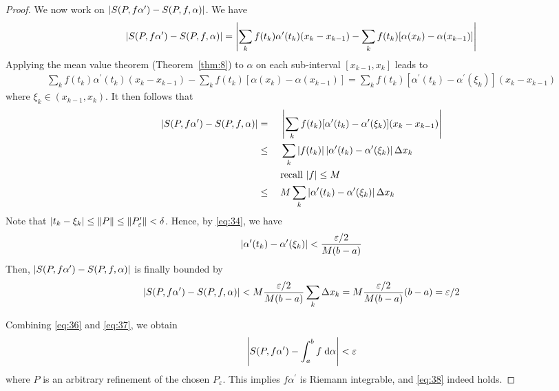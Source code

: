 \documentclass[thmcnt=section, 12pt]{my-elegantbook}
\begin{document}
\begin{proof}
    \par We now work on $\left\lvert S(P, f\alpha^\prime) - S(P, f, \alpha) \right\rvert$. We have 
    \begin{align*}
        \left\lvert S(P, f\alpha^\prime) - S(P, f, \alpha) \right\rvert
        = \left\lvert 
            \sum_{k} f(t_k) \alpha^\prime(t_k) (x_k - x_{k-1})
            - \sum_{k} f(t_k) [\alpha(x_{k}) - \alpha(x_{k-1})]
         \right\rvert
    \end{align*}
    Applying the mean value theorem (Theorem~\ref{thm:8}) to $\alpha$ on each sub-interval $[x_{k-1}, x_k]$ leads to 
    \begin{align*}
        \sum_{k} f(t_k) \alpha^\prime(t_k) (x_k - x_{k-1})
            - \sum_{k} f(t_k) [\alpha(x_{k}) - \alpha(x_{k-1})]
        = \sum_{k} f(t_k) [\alpha^\prime(t_k) - \alpha^\prime(\xi_k)] (x_k - x_{k-1})
    \end{align*}
    where $\xi_k \in (x_{k-1}, x_k)$. It then follows that 
    \begin{alignat*}{2}
        \left\lvert S(P, f\alpha^\prime) - S(P, f, \alpha) \right\rvert
        &=& \; & \left\lvert \sum_{k} f(t_k) [\alpha^\prime(t_k) - \alpha^\prime(\xi_k)] (x_k - x_{k-1}) \right\rvert \\ 
        &\leq&& \sum_{k} \left\lvert f(t_k) \right\rvert \left\lvert \alpha^\prime(t_k) - \alpha^\prime(\xi_k) \right\rvert \Delta x_k \\ 
        &&&\text{recall $\left\lvert f \right\rvert \leq M$} \\
        &\leq&& M \sum_{k} \left\lvert \alpha^\prime(t_k) - \alpha^\prime(\xi_k) \right\rvert \Delta x_k
    \end{alignat*}
    Note that $\left\lvert t_k - \xi_k \right\rvert \leq \left\lVert P \right\rVert \leq \left\lVert P_\varepsilon^\prime \right\rVert < \delta$. Hence, by \eqref{eq:34}, we have 
    \begin{align*}
        \left\lvert \alpha^\prime(t_k) - \alpha^\prime(\xi_k) \right\rvert
        < \frac{\varepsilon / 2}{M(b-a)}
    \end{align*}
    Then, $\left\lvert S(P, f\alpha^\prime) - S(P, f, \alpha) \right\rvert$ is finally bounded by
    \begin{align}
        \left\lvert S(P, f\alpha^\prime) - S(P, f, \alpha) \right\rvert
        < M \frac{\varepsilon / 2}{M(b-a)} \sum_k \Delta x_k
        =  M \frac{\varepsilon / 2}{M(b-a)} (b-a)
        = \varepsilon / 2
        \label{eq:37}
    \end{align}

    \par Combining \eqref{eq:36} and \eqref{eq:37}, we obtain
    \begin{align*}
        \left\lvert S(P, f\alpha^\prime) - \int_{a}^{b}f \; \mathrm{d}\alpha \right\rvert < \varepsilon
    \end{align*}
    where $P$ is an arbitrary refinement of the chosen $P_\varepsilon$. This implies $f \alpha^\prime$ is Riemann integrable, and \eqref{eq:38} indeed holds. 
\end{proof}
\end{document}
